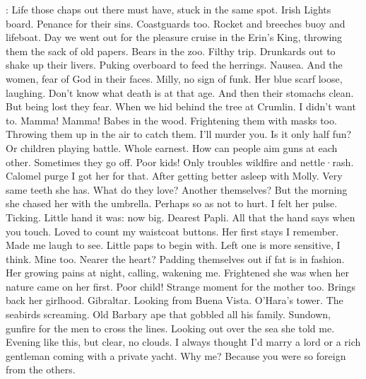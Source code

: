 \Bloom:
Life those chaps out there must have,
stuck in the same spot.
Irish
Lights board.
Penance for their sins.
Coastguards too.
Rocket and breeches
buoy and lifeboat.
Day we went out for the pleasure cruise in the Erin's
King,
throwing them the sack of old papers.
Bears in the zoo.
Filthy trip.
Drunkards out to shake up their livers.
Puking overboard to feed the
herrings.
Nausea.
And the women,
fear of God in their faces.
Milly,
no sign of funk.
Her blue scarf loose,
laughing.
Don't know what death
is at that age.
And then their stomachs clean.
But being lost they fear.
When we hid behind the tree at Crumlin.
I didn't want to.
Mamma!
Mamma!
Babes in the wood.
Frightening them with masks too.
Throwing them up
in the air to catch them.
I'll murder you.
Is it only half fun?
Or children playing battle.
Whole earnest.
How can people aim guns at
each other.
Sometimes they go off.
Poor kids!
Only troubles wildfire
and nettle·rash.
Calomel purge I got her for that.
After getting better
asleep with Molly.
Very same teeth she has.
What do they love?
Another themselves?
But the morning she chased her with the umbrella.
Perhaps so as not to hurt.
I felt her pulse.
Ticking.
Little hand
it was:
now big.
Dearest Papli.
All that the hand says when you
touch.
Loved to count my waistcoat buttons.
Her first stays I
remember.
Made me laugh to see.
Little paps to begin with.
Left one is more sensitive,
I think.
Mine too.
Nearer the heart?
Padding
themselves out if fat is in fashion.
Her growing pains at night,
calling,
wakening me.
Frightened she was when her nature came on her first.
Poor child!
Strange moment for the mother too.
Brings back her girlhood.
Gibraltar.
Looking from Buena Vista.
O'Hara's tower.
The seabirds
screaming.
Old Barbary ape that gobbled all his family.
Sundown,
gunfire for the men to cross the lines.
Looking out over the sea she
told me.
Evening like this,
but clear,
no clouds.
I always thought I'd
marry a lord or a rich gentleman coming with a private yacht.
Why me?
Because you were so foreign
from the others.

